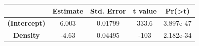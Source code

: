 \documentclass[]{article}
\begin{document}
\begin{longtable}[]{@{}ccccc@{}}
\toprule
\begin{minipage}[b]{0.21\columnwidth}\centering\strut
~\strut
\end{minipage} & \begin{minipage}[b]{0.13\columnwidth}\centering\strut
Estimate\strut
\end{minipage} & \begin{minipage}[b]{0.16\columnwidth}\centering\strut
Std. Error\strut
\end{minipage} & \begin{minipage}[b]{0.12\columnwidth}\centering\strut
t value\strut
\end{minipage} & \begin{minipage}[b]{0.13\columnwidth}\centering\strut
Pr(\textgreater{}\textbar{}t\textbar{})\strut
\end{minipage}\tabularnewline
\midrule
\endhead
\begin{minipage}[t]{0.21\columnwidth}\centering\strut
\textbf{(Intercept)}\strut
\end{minipage} & \begin{minipage}[t]{0.13\columnwidth}\centering\strut
6.003\strut
\end{minipage} & \begin{minipage}[t]{0.16\columnwidth}\centering\strut
0.01799\strut
\end{minipage} & \begin{minipage}[t]{0.12\columnwidth}\centering\strut
333.6\strut
\end{minipage} & \begin{minipage}[t]{0.13\columnwidth}\centering\strut
3.897e-47\strut
\end{minipage}\tabularnewline
\begin{minipage}[t]{0.21\columnwidth}\centering\strut
\textbf{Density}\strut
\end{minipage} & \begin{minipage}[t]{0.13\columnwidth}\centering\strut
-4.63\strut
\end{minipage} & \begin{minipage}[t]{0.16\columnwidth}\centering\strut
0.04495\strut
\end{minipage} & \begin{minipage}[t]{0.12\columnwidth}\centering\strut
-103\strut
\end{minipage} & \begin{minipage}[t]{0.13\columnwidth}\centering\strut
2.182e-34\strut
\end{minipage}\tabularnewline
\bottomrule
\end{longtable}
\end{document}
